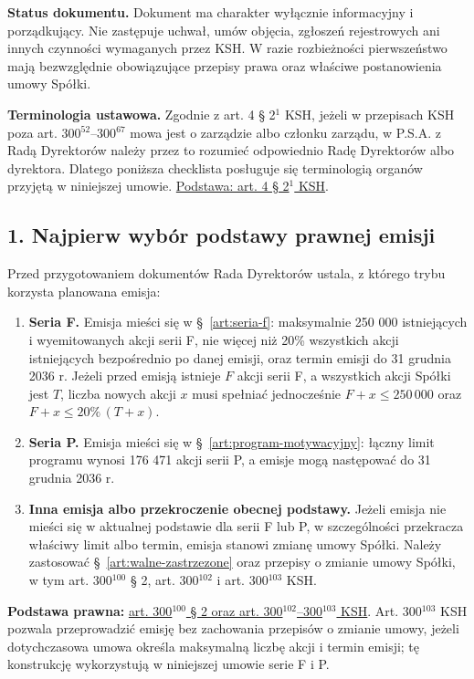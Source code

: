 \documentclass[12pt,a4paper]{report}
\begin{document}
\textbf{Status dokumentu.} Dokument ma charakter wyłącznie informacyjny i porządkujący. Nie zastępuje uchwał, umów objęcia, zgłoszeń rejestrowych ani innych czynności wymaganych przez KSH. W razie rozbieżności pierwszeństwo mają bezwzględnie obowiązujące przepisy prawa oraz właściwe postanowienia umowy Spółki.

\textbf{Terminologia ustawowa.} Zgodnie z art. 4 § 2$^{1}$ KSH, jeżeli w przepisach KSH poza art. 300$^{52}$--300$^{67}$ mowa jest o zarządzie albo członku zarządu, w P.S.A. z Radą Dyrektorów należy przez to rozumieć odpowiednio Radę Dyrektorów albo dyrektora. Dlatego poniższa checklista posługuje się terminologią organów przyjętą w niniejszej umowie. \href{https://eli.gov.pl/api/acts/DU/2024/18/text.html}{Podstawa: art. 4 § 2$^{1}$ KSH}.

\subsection*{1. Najpierw wybór podstawy prawnej emisji}

Przed przygotowaniem dokumentów Rada Dyrektorów ustala, z którego trybu korzysta planowana emisja:
\begin{enumerate}
  \item \textbf{Seria F.} Emisja mieści się w §~\ref{art:seria-f}: maksymalnie 250 000 istniejących i wyemitowanych akcji serii F, nie więcej niż 20\% wszystkich akcji istniejących bezpośrednio po danej emisji, oraz termin emisji do 31 grudnia 2036 r. Jeżeli przed emisją istnieje $F$ akcji serii F, a wszystkich akcji Spółki jest $T$, liczba nowych akcji $x$ musi spełniać jednocześnie $F+x\leq 250\,000$ oraz $F+x\leq 20\%\,(T+x)$.
  \item \textbf{Seria P.} Emisja mieści się w §~\ref{art:program-motywacyjny}: łączny limit programu wynosi 176 471 akcji serii P, a emisje mogą następować do 31 grudnia 2036 r.
  \item \textbf{Inna emisja albo przekroczenie obecnej podstawy.} Jeżeli emisja nie mieści się w aktualnej podstawie dla serii F lub P, w szczególności przekracza właściwy limit albo termin, emisja stanowi zmianę umowy Spółki. Należy zastosować §~\ref{art:walne-zastrzezone} oraz przepisy o zmianie umowy Spółki, w tym art. 300$^{100}$ § 2, art. 300$^{102}$ i art. 300$^{103}$ KSH.
\end{enumerate}

\textbf{Podstawa prawna:} \href{https://eli.gov.pl/api/acts/DU/2024/18/text.html}{art. 300$^{100}$ § 2 oraz art. 300$^{102}$--300$^{103}$ KSH}. Art. 300$^{103}$ KSH pozwala przeprowadzić emisję bez zachowania przepisów o zmianie umowy, jeżeli dotychczasowa umowa określa maksymalną liczbę akcji i termin emisji; tę konstrukcję wykorzystują w niniejszej umowie serie F i P.
\end{document}
